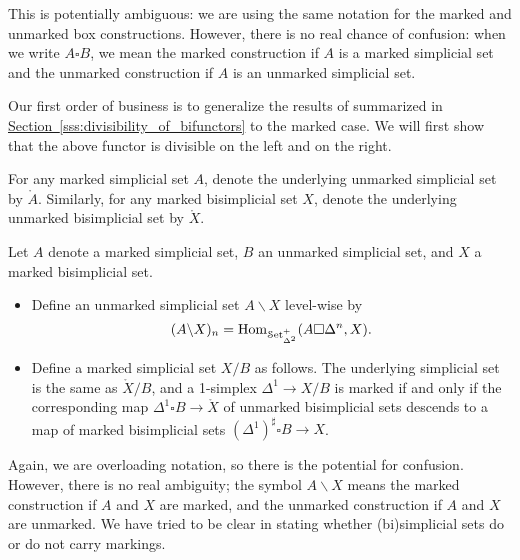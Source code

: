 \documentclass[main.tex]{subfiles}
\begin{document}
This is potentially ambiguous: we are using the same notation for the marked and unmarked box constructions. However, there is no real chance of confusion: when we write $A \square B$, we mean the marked construction if $A$ is a marked simplicial set and the unmarked construction if $A$ is an unmarked simplicial set.

Our first order of business is to generalize the results of \cite{qcats_vs_segal_spaces} summarized in \hyperref[sss:divisibility_of_bifunctors]{Section~\ref*{sss:divisibility_of_bifunctors}} to the marked case. We will first show that the above functor is divisible on the left and on the right.

\begin{notation}
  For any marked simplicial set $A$, denote the underlying unmarked simplicial set by $\mathring{A}$. Similarly, for any marked bisimplicial set $X$, denote the underlying unmarked bisimplicial set by $\mathring{X}$.
\end{notation}

\begin{definition}
  Let $A$ denote a marked simplicial set, $B$ an unmarked simplicial set, and $X$ a marked bisimplicial set.
  \begin{itemize}
    \item Define an unmarked simplicial set $A \backslash X$ level-wise by
      \begin{equation*}
        (A \backslash X)_{n} = \mathrm{Hom}_{\mathcal{S}\mathrm{et}_{\Delta^{2}}^{+}}(A \square \Delta^{n}, X).
      \end{equation*}

    \item Define a marked simplicial set $X / B$ as follows. The underlying simplicial set is the same as $\mathring{X} / B$, and a 1-simplex $\Delta^{1} \to X / B$ is marked if and only if the corresponding map $\Delta^{1} \square B \to \mathring{X}$ of unmarked bisimplicial sets descends to a map of marked bisimplicial sets $(\Delta^{1})^{\sharp} \square B \to X$.
  \end{itemize}
\end{definition}

Again, we are overloading notation, so there is the potential for confusion. However, there is no real ambiguity; the symbol $A \backslash X$ means the marked construction if $A$ and $X$ are marked, and the unmarked construction if $A$ and $X$ are unmarked. We have tried to be clear in stating whether (bi)simplicial sets do or do not carry markings.
\end{document}
